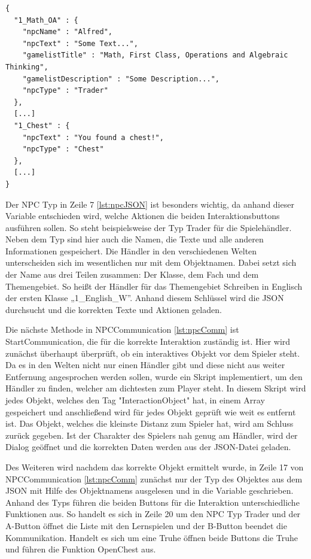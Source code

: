 	\begin{scriptsize}
		\lstset{
			float,
			caption=JSON: NPC Informationen, 
			language=[Sharp]C, 
			frame=single,  
			showstringspaces=false, 
			showspaces=false, 
			numbers=left, 
			captionpos=b, 
			belowcaptionskip=4pt,
			basicstyle=\ttfamily
		} 
		\begin{lstlisting}[label=lst:npcJSON]
{
  "1_Math_OA" : { 
    "npcName" : "Alfred",
    "npcText" : "Some Text...",
    "gamelistTitle" : "Math, First Class, Operations and Algebraic Thinking",
    "gamelistDescription" : "Some Description...",
    "npcType" : "Trader"
  },
  [...]
  "1_Chest" : {
    "npcText" : "You found a chest!",
    "npcType" : "Chest"
  },
  [...]
}
		\end{lstlisting}
	\end{scriptsize}
	
			Der NPC Typ in Zeile 7 \ref{lst:npcJSON} ist besonders wichtig, da anhand dieser Variable entschieden wird, welche Aktionen die beiden Interaktionsbuttons ausführen sollen. So steht beispielsweise der Typ Trader für die Spielehändler. Neben dem Typ sind hier auch die Namen, die Texte und alle anderen Informationen gespeichert. Die Händler in den verschiedenen Welten unterscheiden sich im wesentlichen nur mit dem Objektnamen. Dabei setzt sich der Name aus drei Teilen zusammen: Der Klasse, dem Fach und dem Themengebiet. So heißt der Händler für das Themengebiet Schreiben in Englisch der ersten Klasse „1\_English\_W”. Anhand diesem Schlüssel wird die JSON durchsucht und die korrekten Texte und Aktionen geladen.
	
			Die nächste Methode in NPCCommunication \ref{lst:npcComm} ist StartCommunication, die für die korrekte Interaktion zuständig ist. Hier wird zunächst überhaupt überprüft, ob ein interaktives Objekt vor dem Spieler steht. Da es in den Welten nicht nur einen Händler gibt und diese nicht aus weiter Entfernung angesprochen werden sollen, wurde ein Skript implementiert, um den Händler zu finden, welcher am dichtesten zum Player steht. In diesem Skript wird jedes Objekt, welches den Tag "InteractionObject" hat, in einem Array gespeichert und anschließend wird für jedes Objekt geprüft wie weit es entfernt ist. Das Objekt, welches die kleinste Distanz zum Spieler hat, wird am Schluss zurück gegeben. Ist der Charakter des Spielers nah genug am Händler, wird der Dialog geöffnet und die korrekten Daten werden aus der \ac{JSON}-Datei geladen.
	
			Des Weiteren wird nachdem das korrekte Objekt ermittelt wurde, in Zeile 17 von NPCCommunication \ref{lst:npcComm} zunächst nur der Typ des Objektes aus dem \ac{JSON} mit Hilfe des Objektnamens ausgelesen und in die Variable geschrieben. Anhand des Typs führen die beiden Buttons für die Interaktion unterschiedliche Funktionen aus. So handelt es sich in Zeile 20 um den NPC Typ Trader und der A-Button öffnet die Liste mit den Lernspielen und der B-Button beendet die Kommunikation. Handelt es sich um eine Truhe öffnen beide Buttons die Truhe und führen die Funktion OpenChest aus.

